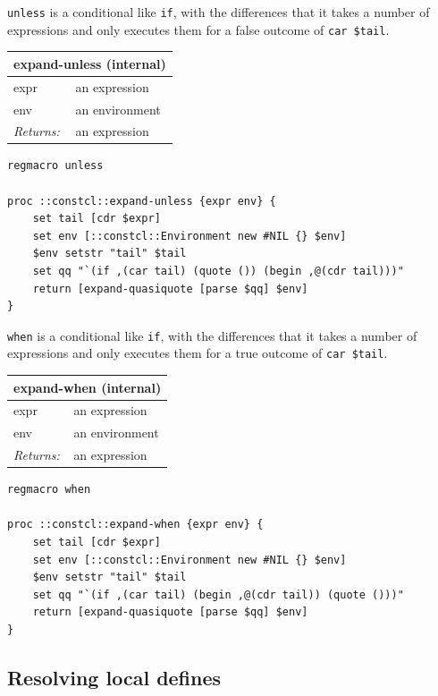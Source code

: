 \documentclass[twoside,9pt]{report}
\begin{document}
\texttt{unless} is a conditional like \texttt{if}, with the differences that it takes a number of expressions and only executes them for a false outcome of \texttt{car \$tail}.

\begin{tabular}{ |l l| }
\hline
\multicolumn{2}{|l|}{expand-unless (internal)} \\
\hline
expr & an expression \\
env & an environment \\
\textit{Returns:} & an expression \\
\hline
\end{tabular}

\noindent\makebox[\linewidth]{\rule{\linewidth}{0.4pt}}
\begin{lstlisting}
regmacro unless
 
proc ::constcl::expand-unless {expr env} {
    set tail [cdr $expr]
    set env [::constcl::Environment new #NIL {} $env]
    $env setstr "tail" $tail
    set qq "`(if ,(car tail) (quote ()) (begin ,@(cdr tail)))"
    return [expand-quasiquote [parse $qq] $env]
}
\end{lstlisting}
\noindent\makebox[\linewidth]{\rule{\linewidth}{0.4pt}}

\texttt{when} is a conditional like \texttt{if}, with the differences that it takes a number of expressions and only executes them for a true outcome of \texttt{car \$tail}.

\begin{tabular}{ |l l| }
\hline
\multicolumn{2}{|l|}{expand-when (internal)} \\
\hline
expr & an expression \\
env & an environment \\
\textit{Returns:} & an expression \\
\hline
\end{tabular}

\noindent\makebox[\linewidth]{\rule{\linewidth}{0.4pt}}
\begin{lstlisting}
regmacro when
 
proc ::constcl::expand-when {expr env} {
    set tail [cdr $expr]
    set env [::constcl::Environment new #NIL {} $env]
    $env setstr "tail" $tail
    set qq "`(if ,(car tail) (begin ,@(cdr tail)) (quote ()))"
    return [expand-quasiquote [parse $qq] $env]
}
\end{lstlisting}
\noindent\makebox[\linewidth]{\rule{\linewidth}{0.4pt}}
\subsection{Resolving local defines}
\label{resolving-local-defines}
\end{document}
